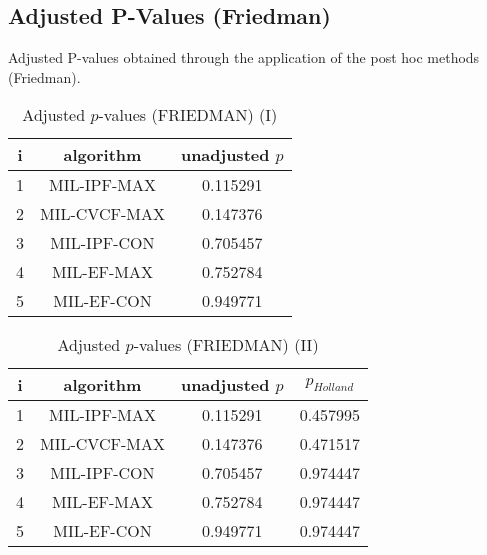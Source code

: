 \documentclass[a4paper,10pt]{article}
\begin{document}
\begin{landscape}
\newpage

\section{Adjusted P-Values (Friedman)}


Adjusted P-values obtained through the application of the post hoc methods (Friedman).

\begin{table}[!htp]
\centering\small
\begin{tabular}{ccc}
i&algorithm&unadjusted $p$\\
\hline1&MIL-IPF-MAX&0.115291\\2&MIL-CVCF-MAX&0.147376\\3&MIL-IPF-CON&0.705457\\4&MIL-EF-MAX&0.752784\\5&MIL-EF-CON&0.949771\\\hline
\end{tabular}
\caption{Adjusted $p$-values (FRIEDMAN) (I)}
\end{table}
\begin{table}[!htp]
\centering\small
\begin{tabular}{cccc}
i&algorithm&unadjusted $p$&$p_{Holland}$\\
\hline1&MIL-IPF-MAX&0.115291&0.457995\\2&MIL-CVCF-MAX&0.147376&0.471517\\3&MIL-IPF-CON&0.705457&0.974447\\4&MIL-EF-MAX&0.752784&0.974447\\5&MIL-EF-CON&0.949771&0.974447\\\hline
\end{tabular}
\caption{Adjusted $p$-values (FRIEDMAN) (II)}
\end{table}

\newpage
\end{landscape}
\end{document}
